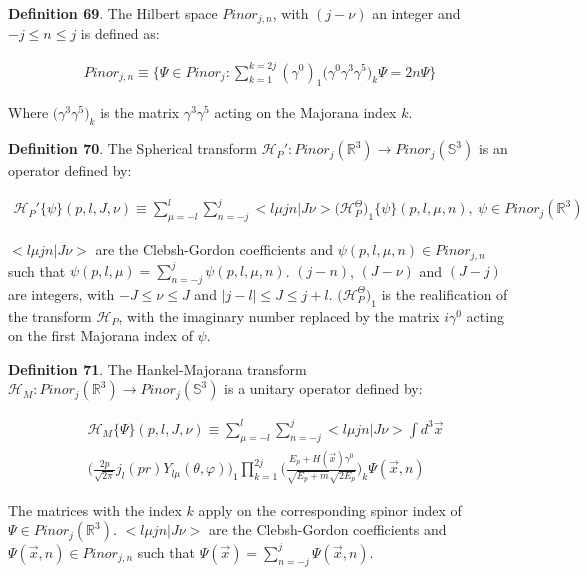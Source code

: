 \documentclass[11pt]{book}
\begin{document}
\textbf{Definition 69}. The Hilbert space \(Pinor_{j,n}\), with
\((j-\nu)\) an integer and \(-j\leq n \leq j\) is defined as:

\begin{equation}\begin{aligned}
Pinor_{j,n}\equiv \{\Psi\in Pinor_{j}:
\sum_{k=1}^{k=2j}(\gamma^0)_1\Big(\gamma^0\gamma^3\gamma^5\Big)_k\Psi
=2n \Psi\}\end{aligned}\end{equation}

Where \(\Big(\gamma^3\gamma^5\Big)_k\) is the matrix
\(\gamma^3\gamma^5\) acting on the Majorana index \(k\).

\textbf{Definition 70}. The Spherical transform
\(\mathcal{H}_{P}': Pinor_j(\mathbb{R}^3)\to Pinor_j(\mathbb{S}^3)\) is
an operator defined by:

\begin{equation}\begin{aligned}
\mathcal{H}_{P}'\{\psi\}(p,l,J,\nu)\equiv
\sum_{\mu=-l}^l\sum_{n=-j}^j
<l\mu jn|J\nu>\Big(\mathcal{H}_{P}^{\Theta}\Big)_1\{\psi\}(p,l,\mu,n),
\ \psi\in Pinor_j(\mathbb{R}^3)\end{aligned}\end{equation}

\(<l\mu jn|J\nu>\) are the Clebsh-Gordon coefficients and
\(\psi(p,l,\mu,n)\in Pinor_{j,n}\) such that
\(\psi(p,l,\mu)=\sum_{n=-j}^j \psi(p,l,\mu,n)\). \((j-n)\), \((J-\nu)\)
and \((J-j)\) are integers, with \(-J\leq\nu\leq J\) and
\(|j-l|\leq J \leq
j+l\). \(\Big(\mathcal{H}_{P}^{\Theta}\Big)_1\) is the realification of
the transform \(\mathcal{H}_{P}\), with the imaginary number replaced by
the matrix \(i\gamma^0\) acting on the first Majorana index of \(\psi\).

\textbf{Definition 71}. The Hankel-Majorana transform
\(\mathcal{H}_M: Pinor_j(\mathbb{R}^3)\to Pinor_j(\mathbb{S}^3)\) is a
unitary operator defined by:

\begin{equation}\begin{aligned}
&\mathcal{H}_M\{\Psi\}(p,l,J,\nu)\equiv
\sum_{\mu=-l}^l\sum_{n=-j}^j <l\mu jn|J\nu>\int d^3\vec{x}\\
&\Big(\frac{2 p}{\sqrt{2\pi}}j_l(pr)Y_{l\mu}(\theta,\varphi)\Big)_1
\prod_{k=1}^{2j}\Big(\frac{E_p+H(\vec{x})\gamma^0}{\sqrt{E_p+m}\sqrt{2E_p}}\Big)_k
\Psi(\vec{x},n)\end{aligned}\end{equation}

The matrices with the index \(k\) apply on the corresponding spinor
index of \(\Psi\in Pinor_j(\mathbb{R}^3)\). \(<l\mu jn|J\nu>\) are the
Clebsh-Gordon coefficients and \(\Psi(\vec{x},n)\in Pinor_{j,n}\) such
that \(\Psi(\vec{x})=\sum_{n=-j}^j \Psi(\vec{x},n)\).
\end{document}
